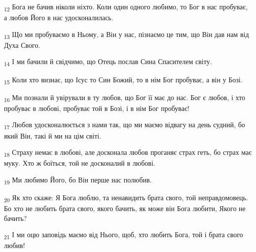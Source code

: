 \begin{tcolorbox}
\textsubscript{12} Бога не бачив ніколи ніхто. Коли один одного любимо, то Бог в нас пробуває, а любов Його в нас удосконалилась.
\end{tcolorbox}
\begin{tcolorbox}
\textsubscript{13} Що ми пробуваємо в Ньому, а Він у нас, пізнаємо це тим, що Він дав нам від Духа Свого.
\end{tcolorbox}
\begin{tcolorbox}
\textsubscript{14} І ми бачили й свідчимо, що Отець послав Сина Спасителем світу.
\end{tcolorbox}
\begin{tcolorbox}
\textsubscript{15} Коли хто визнає, що Ісус то Син Божий, то в нім Бог пробуває, а він у Бозі.
\end{tcolorbox}
\begin{tcolorbox}
\textsubscript{16} Ми познали й увірували в ту любов, що Бог її має до нас. Бог є любов, і хто пробуває в любові, пробуває той в Бозі, і в нім Бог пробуває!
\end{tcolorbox}
\begin{tcolorbox}
\textsubscript{17} Любов удосконалюється з нами так, що ми маємо відвагу на день судний, бо який Він, такі й ми на цім світі.
\end{tcolorbox}
\begin{tcolorbox}
\textsubscript{18} Страху немає в любові, але досконала любов проганяє страх геть, бо страх має муку. Хто ж боїться, той не досконалий в любові.
\end{tcolorbox}
\begin{tcolorbox}
\textsubscript{19} Ми любимо Його, бо Він перше нас полюбив.
\end{tcolorbox}
\begin{tcolorbox}
\textsubscript{20} Як хто скаже: Я Бога люблю, та ненавидить брата свого, той неправдомовець. Бо хто не любить брата свого, якого бачить, як може він Бога любити, Якого не бачить?
\end{tcolorbox}
\begin{tcolorbox}
\textsubscript{21} І ми оцю заповідь маємо від Нього, щоб, хто любить Бога, той і брата свого любив!
\end{tcolorbox}
